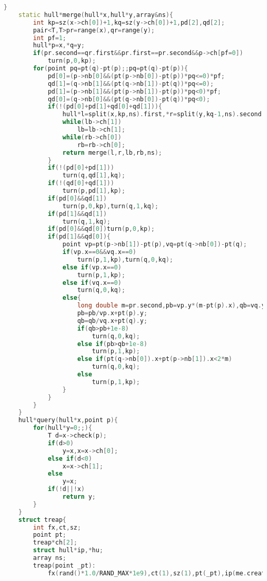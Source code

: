 \documentclass{book}
\begin{document}
\begin{lstlisting}[language=C++,title={Dynamic Convex Hull (Treap).hpp (9485 bytes, 327 lines)}]
    }
    static hull*merge(hull*x,hull*y,array&ns){
        int kp=sz(x->ch[0])+1,kq=sz(y->ch[0])+1,pd[2],qd[2];
        pair<T,T>pr=range(x),qr=range(y);
        int pf=1;
        hull*p=x,*q=y;
        if(pr.second==qr.first&&pr.first==pr.second&&p->ch[pf=0])
            turn(p,0,kp);
        for(point pq=pt(q)-pt(p);;pq=pt(q)-pt(p)){
            pd[0]=(p->nb[0]&&(pt(p->nb[0])-pt(p))*pq<=0)*pf;
            qd[1]=(q->nb[1]&&(pt(q->nb[1])-pt(q))*pq<=0);
            pd[1]=(p->nb[1]&&(pt(p->nb[1])-pt(p))*pq<0)*pf;
            qd[0]=(q->nb[0]&&(pt(q->nb[0])-pt(q))*pq<0);
            if(!(pd[0]+pd[1]+qd[0]+qd[1])){
                hull*l=split(x,kp,ns).first,*r=split(y,kq-1,ns).second,*lb=l,*rb=r;
                while(lb->ch[1])
                    lb=lb->ch[1];
                while(rb->ch[0])
                    rb=rb->ch[0];
                return merge(l,r,lb,rb,ns);
            }
            if(!(pd[0]+pd[1]))
                turn(q,qd[1],kq);
            if(!(qd[0]+qd[1]))
                turn(p,pd[1],kp);
            if(pd[0]&&qd[1])
                turn(p,0,kp),turn(q,1,kq);
            if(pd[1]&&qd[1])
                turn(q,1,kq);
            if(pd[0]&&qd[0])turn(p,0,kp);
            if(pd[1]&&qd[0]){
                point vp=pt(p->nb[1])-pt(p),vq=pt(q->nb[0])-pt(q);
                if(vp.x==0&&vq.x==0)
                    turn(p,1,kp),turn(q,0,kq);
                else if(vp.x==0)
                    turn(p,1,kp);
                else if(vq.x==0)
                    turn(q,0,kq);
                else{
                    long double m=pr.second,pb=vp.y*(m-pt(p).x),qb=vq.y*(m-pt(q).x);
                    pb=pb/vp.x+pt(p).y;
                    qb=qb/vq.x+pt(q).y;
                    if(qb>pb+1e-8)
                        turn(q,0,kq);
                    else if(pb>qb+1e-8)
                        turn(p,1,kp);
                    else if(pt(q->nb[0]).x+pt(p->nb[1]).x<2*m)
                        turn(q,0,kq);
                    else
                        turn(p,1,kp);
                }
            }
        }
    }
    hull*query(hull*x,point p){
        for(hull*y=0;;){
            T d=x->check(p);
            if(d>0)
                y=x,x=x->ch[0];
            else if(d<0)
                x=x->ch[1];
            else
                y=x;
            if(!d||!x)
                return y;
        }
    }
    struct treap{
        int fx,ct,sz;
        point pt;
        treap*ch[2];
        struct hull*ip,*hu;
        array ns;
        treap(point _pt):
            fx(rand()*1.0/RAND_MAX*1e9),ct(1),sz(1),pt(_pt),ip(me.create(hull(&pt))),hu(ip){

\end{lstlisting}
\end{document}
